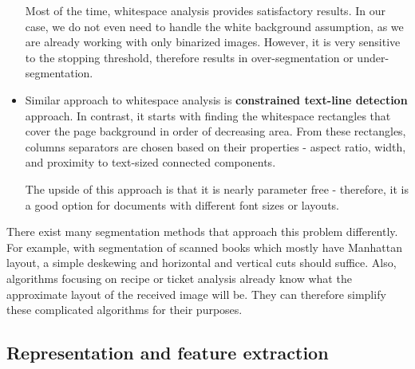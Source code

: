 \begin{itemize}
Most of the time, whitespace analysis provides satisfactory results. In our case, we do not even need to handle the white background assumption, as we are already working with only binarized images. However, it is very sensitive to the stopping threshold, therefore results in over-segmentation or under-segmentation.

\item Similar approach to whitespace analysis is \textbf{constrained text-line detection} approach. In contrast, it starts with finding the whitespace rectangles that cover the page background in order of decreasing area. From these rectangles, columns separators are chosen based on their properties - aspect ratio, width, and proximity to text-sized connected components.

The upside of this approach is that it is nearly parameter free - therefore, it is a good option for documents with different font sizes or layouts.

\end{itemize}

There exist many segmentation methods that approach this problem differently. For example, with segmentation of scanned books which mostly have Manhattan layout, a simple deskewing and horizontal and vertical cuts should suffice. Also, algorithms focusing on recipe or ticket analysis already know what the approximate layout of the received image will be. They can therefore simplify these complicated algorithms for their purposes.

\subsection{Representation and feature extraction}

